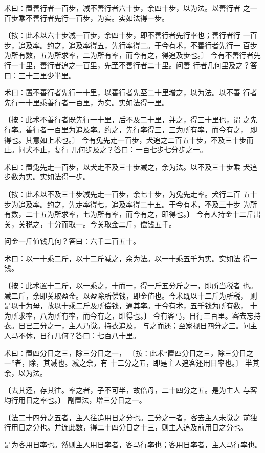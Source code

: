 \documentclass[12pt,UTF8]{ctexbook}
\begin{document}
术曰：置善行者一百步，减不善行者六十步，余四十步，以为法。以善行者 之一百步乘不善行者先行一百步，为实。实如法得一步。

〔按：此术以六十步减一百步，余四十步，即不善行者先行率也；善行者行 一百步，追及率。约之，追及率得五，先行率得二。于今有术，不善行者先行一 百步为所有数，五为所求率，二为所有率，而今有之，得追及步也。〕 今有不善行者先行一十里，善行者追之一百里，先至不善行者二十里。问善 行者几何里及之？答曰：三十三里少半里。

术曰：置不善行者先行一十里，以善行者先至二十里增之，以为法。以不善 行者先行一十里乘善行者一百里，为实。实如法得一里。

〔按：此术不善行者既先行一十里，后不及二十里，并之，得三十里也，谓 之先行率。善行者一百里为追及率。约之，先行率得三，三为所有率，而今有之， 即得也。其意如上术也。〕 今有兔先走一百步，犬追之二百五十步，不及三十步而止。问犬不止，复行 几何步及之？答曰：一百七步七分步之一。

术曰：置兔先走一百步，以犬走不及三十步减之，余为法。以不及三十步乘 犬追步数为实。实如法得一步。

〔按：此术以不及三十步减先走一百步，余七十步，为兔先走率。犬行二百 五十步为追及率。约之，先走率得七，追及率得二十五。于今有术，不及三十步 为所有数，二十五为所求率，七为所有率，而今有之，即得也。〕 今有人持金十二斤出关，关税之，十分而取一。今关取金二斤，偿钱五千。

问金一斤值钱几何？答曰：六千二百五十。

术曰：以一十乘二斤，以十二斤减之，余为法。以一十乘五千为实。实如法 得一钱。

〔按：此术置十二斤，以一乘之，十而一，得一斤五分斤之一，即所当税者 也。减二斤，余即关取盈金。以盈除所偿钱，即金值也。今术既以十二斤为所税， 则是以十为母，故以十乘二斤及所偿钱，通其率。于今有术，五千钱为所有数， 十为所求率，八为所有率，而今有之，即得也。〕 今有客马，日行三百里。客去忘持衣。日已三分之一，主人乃觉。持衣追及， 与之而还；至家视日四分之三。问主人马不休，日行几何？答曰：七百八十里。

术曰：置四分日之三，除三分日之一， 〔按：此术“置四分日之三，除三分日之一”者，除，其减也。减之余，有 十二分之五，即是主人追客还用日率也。〕 半其余，以为法。

〔去其还，存其往。率之者，子不可半，故倍母，二十四分之五。是为主人 与客均行用日之率也。〕 副置法，增三分日之一。

〔法二十四分之五者，主人往追用日之分也。三分之一者，客去主人未觉之 前独行用日之分也。并连此数，得二十四分日之十三，则主人追及前用日之分也。

是为客用日率也。然则主人用日率者，客马行率也；客用日率者，主人马行率也。
\end{document}
